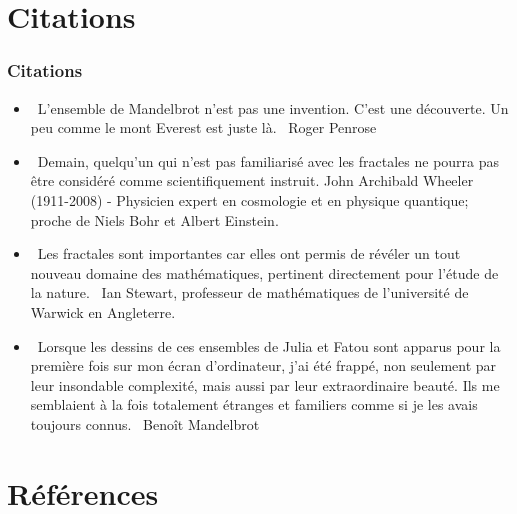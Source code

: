 \documentclass[aspectratio=1610]{beamer}
\begin{document}
\section{Citations}

\begin{frame}
\frametitle{Citations}
\begin{itemize}
    \item \guillemotleft \ L'ensemble de Mandelbrot n'est pas une invention. C'est une découverte. Un peu comme le mont Everest est juste là. \guillemotright \ Roger Penrose
    \item \guillemotleft \ Demain, quelqu'un qui n'est pas familiarisé avec les fractales ne pourra pas être considéré comme scientifiquement instruit. \guillemotright John Archibald Wheeler (1911-2008) - Physicien expert en cosmologie et en physique quantique; proche de Niels Bohr et Albert Einstein.
    \item \guillemotleft  \ Les fractales sont importantes car elles ont permis de révéler un tout nouveau domaine des mathématiques, pertinent directement pour l'étude de la nature. \guillemotright \  Ian Stewart, professeur de mathématiques de l'université de Warwick en Angleterre.
    \item \guillemotleft  \ Lorsque les dessins de ces ensembles de Julia et Fatou sont apparus pour la première fois sur mon écran d'ordinateur, j'ai été frappé, non seulement par leur insondable complexité, mais aussi par leur extraordinaire beauté. Ils me semblaient à la fois totalement étranges et familiers comme si je les avais toujours connus. \guillemotright \ Benoît Mandelbrot
\end{itemize} 
\end{frame}

\section{Références}
\end{document}
